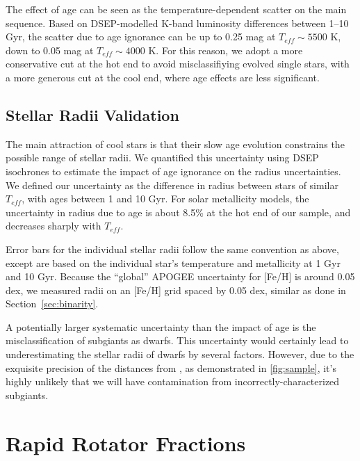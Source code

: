 \documentclass[manuscript]{aastex6}
\newcommand{\Teff}{\ensuremath{T_{eff}}}
\begin{document}
The effect of age can be seen as the temperature-dependent scatter on the main
sequence. Based on DSEP-modelled K-band luminosity differences between 1--10
Gyr, the scatter due to age ignorance can be up to 0.25 mag at \(\Teff \sim
5500\) K, down to 0.05 mag at \(\Teff \sim 4000 \) K. For this reason, we adopt
a more conservative cut at the hot end to avoid misclassifiying evolved single
stars, with a more generous cut at the cool end, where age effects are less
significant.


\subsection{Stellar Radii Validation}
\label{sec:radii}

The main attraction of cool stars is that their slow age evolution
constrains the possible range of stellar radii. We quantified this uncertainty 
using DSEP isochrones to estimate the impact of age 
ignorance on the radius uncertainties. We defined our uncertainty as the 
difference in radius between stars of similar \Teff{}, with ages between 1 
and 10 Gyr. For solar metallicity models, the uncertainty in radius due to 
age is about 8.5\% at the hot end of our sample, and decreases sharply with 
\Teff. 

Error bars for the individual stellar radii follow the same convention as
above, except are based on the individual star's temperature and metallicity 
at 1 Gyr and 10 Gyr. Because the ``global'' APOGEE uncertainty for [Fe/H] is 
around 0.05 dex, we measured radii on an [Fe/H] grid spaced by 0.05 dex,
similar as done in Section~\ref{sec:binarity}.

A potentially larger systematic uncertainty than the impact of age is the 
misclassification of subgiants as dwarfs. This uncertainty would certainly lead to underestimating
the stellar radii of dwarfs by several factors. However, due to the exquisite
precision of the distances from \citep{Berger18b}, as demonstrated in
\cref{fig:sample}, it's highly unlikely that we will have contamination from
incorrectly-characterized subgiants. 

\section{Rapid Rotator Fractions}
\label{sec:fraction}
\end{document}
